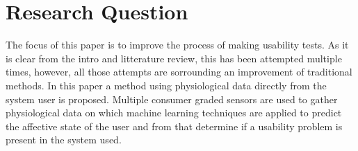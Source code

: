 \section{Research Question}
The focus of this paper is to improve the process of making usability tests. 
As it is clear from the intro and litterature review, this has been attempted multiple times, however, all those attempts are sorrounding an improvement of traditional methods.
In this paper a method using physiological data directly from the system user is proposed.
Multiple consumer graded sensors are used to gather physiological data on which machine learning techniques are applied to predict the affective state of the user and from that determine if a usability problem is present in the system used.  